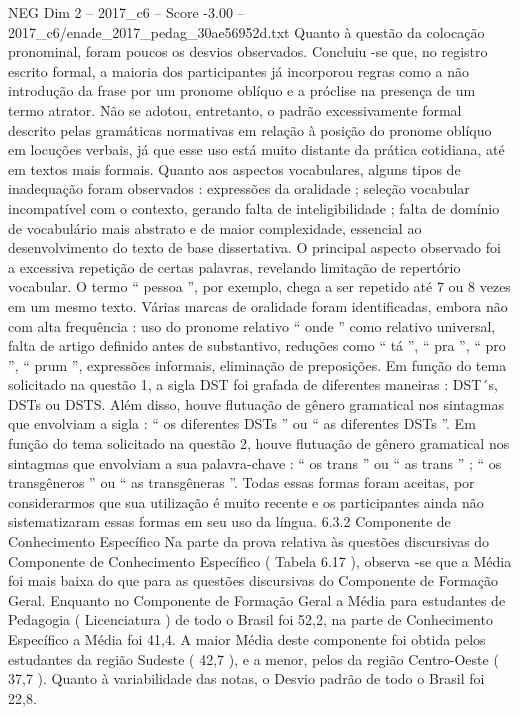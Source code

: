 \begin{textsample}{NEG Dim 2 – 2017\_c6 – Score -3.00 – 2017\_c6/enade\_2017\_pedag\_30ae56952d.txt}
Quanto à questão da colocação pronominal, foram poucos os desvios observados.
Concluiu -se que, no registro escrito formal, a maioria dos participantes já incorporou regras como a não introdução da frase por um pronome oblíquo e a próclise na presença de um termo atrator.
Não se adotou, entretanto, o padrão excessivamente formal descrito pelas gramáticas normativas em relação à posição do pronome oblíquo em locuções verbais, já que esse uso está muito distante da prática cotidiana, até em textos mais formais.
Quanto aos aspectos vocabulares, alguns tipos de inadequação foram observados : expressões da oralidade ; seleção vocabular incompatível com o contexto, gerando falta de inteligibilidade ; falta de domínio de vocabulário mais abstrato e de maior complexidade, essencial ao desenvolvimento do texto de base dissertativa.
O principal aspecto observado foi a excessiva repetição de certas palavras, revelando limitação de repertório vocabular.
O termo “ pessoa ”, por exemplo, chega a ser repetido até 7 ou 8 vezes em um mesmo texto.
Várias marcas de oralidade foram identificadas, embora não com alta frequência : uso do pronome relativo “ onde ” como relativo universal, falta de artigo definido antes de substantivo, reduções como “ tá ”, “ pra ”, “ pro ”, “ prum ”, expressões informais, eliminação de preposições.
Em função do tema solicitado na questão 1, a sigla DST foi grafada de diferentes maneiras : DST´s, DSTs ou DSTS.
Além disso, houve flutuação de gênero gramatical nos sintagmas que envolviam a sigla : “ os diferentes DSTs ” ou “ as diferentes DSTs ”.
Em função do tema solicitado na questão 2, houve flutuação de gênero gramatical nos sintagmas que envolviam a sua palavra-chave : “ os trans ” ou “ as trans ” ; “ os transgêneros ” ou “ as transgêneras ”.
Todas essas formas foram aceitas, por considerarmos que sua utilização é muito recente e os participantes ainda não sistematizaram essas formas em seu uso da língua. 6.3.2 Componente de Conhecimento Específico Na parte da prova relativa às questões discursivas do Componente de Conhecimento Específico ( Tabela 6.17 ), observa -se que a Média foi mais baixa do que para as questões discursivas do Componente de Formação Geral.
Enquanto no Componente de Formação Geral a Média para estudantes de Pedagogia ( Licenciatura ) de todo o Brasil foi 52,2, na parte de Conhecimento Específico a Média foi 41,4.
A maior Média deste componente foi obtida pelos estudantes da região Sudeste ( 42,7 ), e a menor, pelos da região Centro-Oeste ( 37,7 ).
Quanto à variabilidade das notas, o Desvio padrão de todo o Brasil foi 22,8.

\end{textsample}
